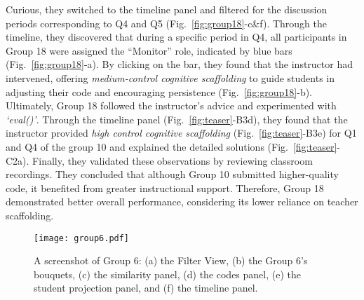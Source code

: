 Curious, they switched to the timeline panel and filtered for the discussion periods corresponding to Q4 and Q5 (Fig.~\ref{fig:group18}-c\&f).
Through the timeline, they discovered that during a specific period in Q4, all participants in Group 18 were assigned the ``Monitor'' role, indicated by blue bars (Fig.~\ref{fig:group18}-a).
By clicking on the bar, they found that the instructor had intervened, offering \textit{medium-control cognitive scaffolding} to guide students in adjusting their code and encouraging persistence (Fig.~\ref{fig:group18}-b).
Ultimately, Group 18 followed the instructor's advice and experimented with \textit{`eval()'}.
Through the timeline panel (Fig.~\ref{fig:teaser}-B3d), they found that the instructor provided \textit{high control cognitive scaffolding} (Fig.~\ref{fig:teaser}-B3e) for Q1 and Q4 of the group 10 and explained the detailed solutions (Fig.~\ref{fig:teaser}-C2a).
Finally, they validated these observations by reviewing classroom recordings.
They concluded that although Group 10 submitted higher-quality code, it benefited from greater instructional support. Therefore, Group 18 demonstrated better overall performance, considering its lower reliance on teacher scaffolding.








\begin{figure*}
	\centering
	\texttt{[image: group6.pdf]}
	\caption{A screenshot of Group 6: (a) the Filter View, (b) the Group 6's bouquets, (c) the similarity panel, (d) the codes panel, (e) the student projection panel, and (f) the timeline panel.}
	\label{fig:group6}
\end{figure*}

